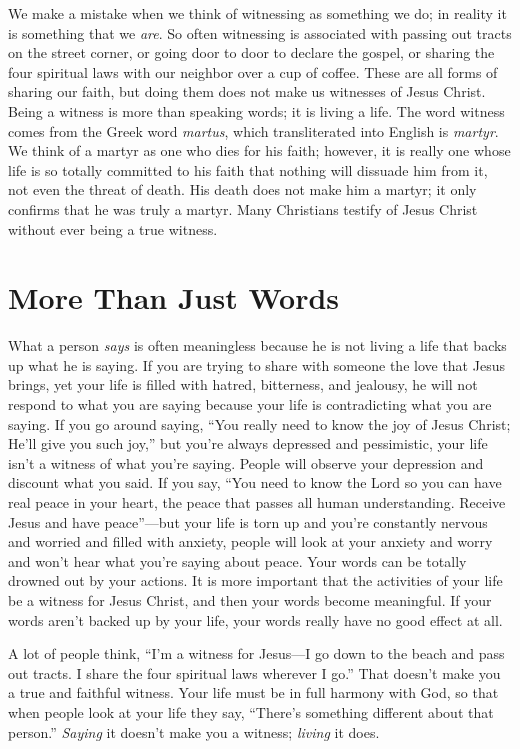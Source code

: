 We make a mistake when we think of witnessing as
something we do; in reality it is something that we \emph{are}. So
often witnessing is associated with passing out tracts on the
street corner, or going door to door to declare the gospel,
or sharing the four spiritual laws with our neighbor over
a cup of coffee. These are all forms of sharing our faith,
but doing them does not make us witnesses of Jesus Christ.
Being a witness is more than speaking words; it is living a
life. The word witness comes from the Greek word \emph{martus},
which transliterated into English is \emph{martyr}. We think of a
martyr as one who dies for his faith; however, it is really one
whose life is so totally committed to his faith that nothing
will dissuade him from it, not even the threat of death. His
death does not make him a martyr; it only confirms that he
was truly a martyr. Many Christians testify of Jesus Christ
without ever being a true witness.


\section*{More Than Just Words}

What a person \emph{says} is often meaningless because he is
not living a life that backs up what he is saying. If you are
trying to share with someone the love that Jesus brings, yet
your life is filled with hatred, bitterness, and jealousy, he
will not respond to what you are saying because your life is
contradicting what you are saying. If you go around saying,
“You really need to know the joy of Jesus Christ; He’ll give
you such joy,” but you’re always depressed and pessimistic,
your life isn’t a witness of what you’re saying. People will
observe your depression and discount what you said. If you
say, “You need to know the Lord so you can have real peace
in your heart, the peace that passes all human understanding.
Receive Jesus and have peace”—but your life is torn up
and you’re constantly nervous and worried and filled with
anxiety, people will look at your anxiety and worry and
won’t hear what you’re saying about peace. Your words can
be totally drowned out by your actions. It is more important
that the activities of your life be a witness for Jesus Christ,
and then your words become meaningful. If your words
aren’t backed up by your life, your words really have no
good effect at all.

A lot of people think, “I’m a witness for Jesus—I go
down to the beach and pass out tracts. I share the four spiritual
laws wherever I go.” That doesn’t make you a true
and faithful witness. Your life must be in full harmony with
God, so that when people look at your life they say, “There’s
something different about that person.” \emph{Saying} it doesn’t
make you a witness; \emph{living} it does.

